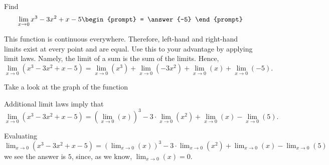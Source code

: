 \documentclass{ximera}
\author{Gregory Hartman \and Matthew Carr}
\begin{document}
\begin{exercise}



  Find 
  \[
  \lim_{x\to 0} x^3-3x^2+x-5
  \begin{prompt}
  = \answer{-5}
  \end{prompt}
  \]
    \begin{hint}
      This function is continuous everywhere. Therefore, left-hand and right-hand limits exist at every point and are equal. Use this to your advantage by applying limit laws. Namely, the limit of a sum is the sum of the limits. Hence, 
    \[
    \lim_{x\to 0} \left( x^3-3x^2+x-5 \right)  
    = \lim_{x\to 0} \left( x^3 \right) +
    \lim_{x\to 0} \left( -3x^2 \right) +
    \lim_{x\to 0} \left( x \right) +
    \lim_{x\to 0} \left(-5\right).
    \]

    \end{hint}
     \begin{hint}
    Take a look at the graph of the function
    \begin{center}
      \end{center}
    \end{hint}
    Additional limit laws imply that
    \[
    \lim_{x\to 0} \left( x^3-3x^2+x-5 \right)  
    = \left({\lim_{x\to 0} \left( x \right)}\right)^3 -
    3\cdot\lim_{x\to 0} \left( x^2 \right) +
    \lim_{x\to 0} \left( x \right) -
    \lim_{x\to 0} \left(5\right).
    \]
    \begin{hint}
     Evaluating $\lim_{x\to 0} \left( x^3-3x^2+x-5 \right)  
    = \left({\lim_{x\to 0} \left( x \right)}\right)^3 -
    3\cdot\lim_{x\to 0} \left( x^2 \right) +
    \lim_{x\to 0} \left( x \right) -
    \lim_{x\to 0} \left(5\right)$
    we see the answer is $5$, since, as we know, $\lim_{x\to0}\left({x}\right)=0$.
     \end{hint}
    
\end{exercise}
\end{document}
